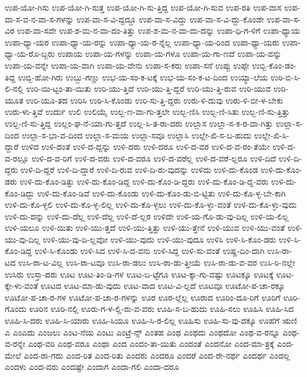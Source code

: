 {ಉಪ-ಯೋ-ಗಿಸು
ಉಪ-ಯೋ-ಗಿ-ಸುತ್ತ
ಉಪ-ಯೋ-ಗಿ-ಸು-ತ್ತಿದ್ದ
ಉಪ-ಯೋ-ಗಿ-ಸುವ
ಉಪ-ರತಿ
ಉಪ-ವಾಸ
ಉಪ-ವಾ-ಸ-ವ-ನ-ವಾ-ಸ-ಗಳನ್ನು
ಉಪ-ವಾ-ಸ-ವಿ-ದ್ದದ್ದೂ
ಉಪ-ವಾ-ಸ-ವಿದ್ದು
ಉಪ-ವಾ-ಸ-ವಿ-ದ್ದು-ಕೊಂಡೇ
ಉಪ-ವಾ-ಸ-ವಿರ
ಉಪ-ವಾ-ಸವೇ
ಉಪ-ಶ-ಮ-ನ-ವಾ-ದಂ-ತಿತ್ತು
ಉಪ-ಶ-ಮ-ನ-ವಾ-ದು-ದನ್ನು
ಉಪಾ-ಧಿ-ಗ-ಳಿಗೆ
ಉಪಾ-ಧ್ಯಾಯ
ಉಪಾ-ಧ್ಯಾ-ಯರ
ಉಪಾ-ಧ್ಯಾ-ಯ-ರನ್ನು
ಉಪಾ-ಧ್ಯಾ-ಯ-ರ-ನ್ನೆಲ್ಲ
ಉಪಾ-ಧ್ಯಾ-ಯ-ರಿಂದ
ಉಪಾ-ಧ್ಯಾ-ಯರು
ಉಪಾ-ಧ್ಯಾ-ಯ-ರೊ-ಬ್ಬರು
ಉಪಾಯ
ಉಪಾ-ಯ-ಗಳನ್ನು
ಉಪಾ-ಯ-ಗಳೂ
ಉಪಾ-ಯ-ಗಾ-ಣದೆ
ಉಪಾ-ಯ-ವನ್ನು
ಉಪಾ-ಯ-ವನ್ನೇ
ಉಪಾ-ಯ-ವಾಗಿ
ಉಪಾ-ಯ-ವೇನು
ಉಪಾ-ಸ-ಕರು
ಉಪಾ-ಸನೆ
ಉಪ್ಪು
ಉಪ್ಪೇ
ಉಬ್ಬಿ-ಕೊಂ-ಡಂ-ತಿದ್ದ
ಉಬ್ಬಿ-ಹೋ-ಗಿರು
ಉಬ್ಬು-ಗಣ್ಣು
ಉಭ-ಯ-ಸಂ-ಕ-ಟಕ್ಕೆ
ಉಭ-ಯ-ಸಂ-ಕ-ಟ-ದಿಂದ
ಉಯ್ಯಾ-ಲೆಯ
ಉರಿ-ಬಿ-ಸಿ-ಲಿ-ನಲ್ಲಿ
ಉರಿ-ಯಿ-ಟ್ಟಂ-ತಾ-ಯಿತು
ಉರಿ-ಯು-ತ್ತಿದೆ
ಉರಿ-ಯು-ತ್ತಿ-ದ್ದರೆ
ಉರಿ-ಯು-ತ್ತಿ-ರುವ
ಉರಿ-ಯುವ
ಉರಿ-ಯೂತ
ಉರಿ-ಯೂ-ತದ
ಉರಿಸಿ
ಉರಿ-ಸಿ-ಕೊಂಡು
ಉರಿ-ಸು-ತ್ತಿ-ದ್ದರು
ಉರು-ಳಿ-ದುವು
ಉರು-ಳಿ-ಬೀ-ಳ-ಬೇಕು
ಉರು-ಳು-ತ್ತಿವೆ
ಉರ್ದು
ಉಲಿ
ಉಲಿಯೈ
ಉಲ್ಬ-ಣ-ವಾ-ಗು-ತ್ತಲೇ
ಉಲ್ಬ-ಣಿಸಿ
ಉಲ್ಬ-ಣಿ-ಸಿತು
ಉಲ್ಬ-ಣಿ-ಸು-ತ್ತಿತ್ತು
ಉಲ್ಬ-ಣಿ-ಸು-ತ್ತಿದ್ದ
ಉಲ್ಲಂ-ಘ-ನೆ-ಯಾ-ಗು-ತ್ತದೆ
ಉಲ್ಲ-ಸಿ-ತ-ರಾ-ದರು
ಉಲ್ಲಾಸ
ಉಲ್ಲಾ-ಸ-ಕ-ರ-ವಾ-ಗಿತ್ತು
ಉಲ್ಲಾ-ಸ-ದಿಂದ
ಉಲ್ಲಾ-ಸ-ಭಾ-ವ-ದಿಂದ
ಉಲ್ಲಾ-ಸ-ಮಯ
ಉಲ್ಲಾ-ಸವೂ
ಉಲ್ಲಾಸಿ
ಉಲ್ಲೇ-ಖಿ-ಸ-ಬ-ಹುದು
ಉಲ್ಲೇ-ಖಿ-ಸಿ-ದ್ದಾರೆ
ಉಳಿದ
ಉಳಿ-ದಂತೆ
ಉಳಿ-ದ-ದ್ದನ್ನು
ಉಳಿ-ದರು
ಉಳಿ-ದರೂ
ಉಳಿ-ದ-ವರ
ಉಳಿ-ದ-ವ-ರಂ-ತೆಯೇ
ಉಳಿ-ದ-ವ-ರಲ್ಲೂ
ಉಳಿ-ದ-ವ-ರಿಗೆ
ಉಳಿ-ದ-ವರು
ಉಳಿ-ದ-ವರೂ
ಉಳಿ-ದ-ವರೆಲ್ಲ
ಉಳಿ-ದ-ವರೆ-ಲ್ಲರೂ
ಉಳಿ-ದಿದೆ
ಉಳಿ-ದಿ-ದ್ದರು
ಉಳಿ-ದಿ-ದ್ದರೆ
ಉಳಿ-ದಿ-ದ್ದಾರೆ
ಉಳಿ-ದಿ-ರುವ
ಉಳಿ-ದಿ-ರು-ವುದನ್ನು
ಉಳಿದು
ಉಳಿ-ದು-ಕೊಂಡ
ಉಳಿ-ದು-ಕೊಂ-ಡರು
ಉಳಿ-ದು-ಕೊಂ-ಡಿತ್ತು
ಉಳಿ-ದು-ಕೊಂ-ಡಿದ್ದ
ಉಳಿ-ದು-ಕೊಂ-ಡಿ-ದ್ದರು
ಉಳಿ-ದು-ಕೊಂ-ಡಿ-ದ್ದ-ವರು
ಉಳಿ-ದು-ಕೊಂ-ಡಿದ್ದು
ಉಳಿ-ದು-ಕೊಂ-ಡಿವೆ
ಉಳಿ-ದು-ಕೊಂಡು
ಉಳಿ-ದು-ಕೊಂ-ಡು-ಬಿ-ಟ್ಟಿತು
ಉಳಿ-ದು-ಕೊ-ಳ್ಳ-ಬೇ-ಕಾಗಿ
ಉಳಿ-ದು-ಕೊ-ಳ್ಳಲಿ
ಉಳಿ-ದು-ಕೊ-ಳ್ಳ-ಲಿಲ್ಲ
ಉಳಿ-ದು-ಕೊ-ಳ್ಳಲು
ಉಳಿ-ದು-ಕೊ-ಳ್ಳು-ವಂತೆ
ಉಳಿ-ದು-ಕೊ-ಳ್ಳು-ವುದು
ಉಳಿ-ದು-ದನ್ನು
ಉಳಿ-ದು-ದೆಲ್ಲ
ಉಳಿ-ದೆಲ್ಲ
ಉಳಿ-ದೆ-ಲ್ಲರ
ಉಳಿದೇ
ಉಳಿ-ಯ-ಗೊ-ಡು-ವು-ದಿಲ್ಲ
ಉಳಿ-ಯ-ಲಿಲ್ಲ
ಉಳಿ-ಯಲೂ
ಉಳಿ-ಯಿತು
ಉಳಿ-ಯು-ತ್ತದೆ
ಉಳಿ-ಯು-ತ್ತಿತ್ತು
ಉಳಿ-ಯು-ತ್ತೇನೆ
ಉಳಿ-ಯುವ
ಉಳಿ-ಯು-ವಂತೆ
ಉಳಿ-ಯು-ವು-ದಿಲ್ಲ
ಉಳಿ-ಯು-ವು-ದಿ-ಲ್ಲವೋ
ಉಳಿ-ಯು-ವುದು
ಉಳಿ-ಯು-ವುದೂ
ಉಳಿಸಿ
ಉಳಿ-ಸಿ-ಕೊಂ-ಡರು
ಉಳಿ-ಸಿ-ಕೊಂ-ಡಿದ್ದ
ಉಳಿ-ಸಿ-ಕೊಂಡು
ಉಳಿ-ಸಿದ
ಉಳಿ-ಸಿ-ದ-ವನು
ಉಳಿ-ಸಿದ್ದ
ಉಳಿ-ಸು-ವಂತೆ
ಉಷ್ಣ-ದಿಂ-ದಾಗಿ
ಉಸಿ-ರಾ-ಟದ
ಉಸಿ-ರಾ-ಟ-ವಿಲ್ಲ
ಉಸಿ-ರಾ-ಟವೂ
ಉಸಿ-ರಾ-ಡಲು
ಉಸಿ-ರಾ-ಡು-ತ್ತೀಯೆ
ಉಸಿ-ರಾ-ಡು-ವ-ವರ
ಉಸಿ-ರಿ-ನಲ್ಲೇ
ಉಸಿರು
ಉಸ್ತಾ-ದರು
ಊಟ
ಊಟ-ತಿಂ-ಡಿ-ಗಳ
ಊಟ-ಬ-ಟ್ಟೆಗೂ
ಊಟ-ಕ್ಕಾ-ಗು-ವಷ್ಟು
ಊಟಕ್ಕೂ
ಊಟಕ್ಕೆ
ಊಟ-ಕ್ಕೇ-ಳು-ವಂತೆ
ಊಟದ
ಊಟ-ಮಾ-ಡು-ವುದು
ಊಟ-ವಾದ
ಊಟ-ವಿ-ಲ್ಲದೆ
ಊಟವೂ
ಊಟೋ-ಪ-ಚಾ-ರಕ್ಕೂ
ಊಟೋ-ಪ-ಚಾ-ರ-ಗಳ
ಊಟೋ-ಪ-ಚಾ-ರ-ಗಳನ್ನು
ಊರ
ಊರ-ಲ್ಲೆಲ್ಲ
ಊರಾದ
ಊರಿಂ-ದೂ-ರಿಗೆ
ಊರಿಗೆ
ಊರಿ-ಗೊಂದು
ಊರಿನ
ಊರಿ-ನಲ್ಲಿ
ಊರು-ಗ-ಳ-ಲ್ಲಿ-ರು-ವ-ವರು
ಊಹಿ-ಸ-ಬ-ಹುದು
ಊಹಿ-ಸಲು
ಊಹಿಸಿ
ಊಹಿ-ಸಿದ
ಊಹಿ-ಸಿ-ದರು
ಊಹಿ-ಸಿ-ಯಾರು
ಊಹಿ-ಸಿಯೂ
ಊಹಿ-ಸಿ-ರ-ಲಿಲ್ಲ
ಊಹಿಸು
ಊಹಿ-ಸು-ವು-ದಕ್ಕೂ
ಊಹೆಗೆ
ಋಣಿ
ಎ
ಎಂಎದು
ಎಂಜಲು
ಎಂಟ-ನೆಯ
ಎಂಟು
ಎಂಟ್ರೆ-ನ್ಸ್
ಎಂತಹ
ಎಂಥ
ಎಂಥದು
ಎಂಥದೋ
ಎಂಥ-ವ-ರನ್ನೂ
ಎಂಥ-ವ-ರನ್ನೇ
ಎಂಥ-ವರಿ
ಎಂಥ-ವರೂ
ಎಂಥಾ
ಎಂದ
ಎಂದಂ-ತಾ-ಯಿತು
ಎಂದಂತೆ
ಎಂದನೋ
ಎಂದ-ಮಾ-ತ್ರಕ್ಕೆ
ಎಂದ-ಮೇಲೆ
ಎಂದ-ರಾ-ಗದು
ಎಂದ-ರಿತ
ಎಂದ-ರಿತು
ಎಂದರು
ಎಂದರೂ
ಎಂದರೆ
ಎಂದ-ರೇ-ನರ್ಥ
ಎಂದರ್ಥ
ಎಂದಲ್ಲ
ಎಂದಳು
ಎಂದ-ವರು
ಎಂದಷ್ಟೇ
ಎಂದಾಗ
ಎಂದಾ-ಗಲಿ
ಎಂದಾ-ದರೂ
}
